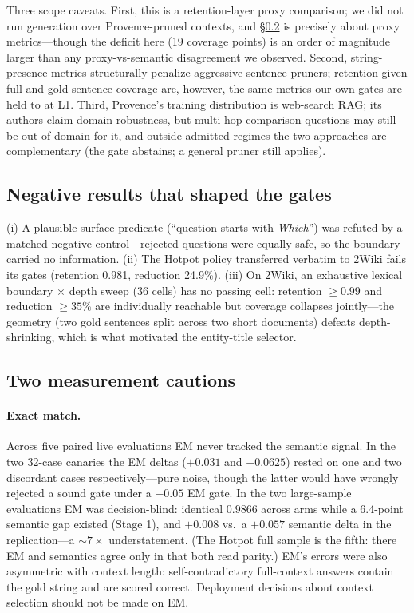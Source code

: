 \documentclass[11pt]{article}
\begin{document}
Three scope caveats. First, this is a retention-layer proxy comparison; we
did not run generation over Provence-pruned contexts, and
\S\ref{sec:cautions} is precisely about proxy metrics---though the deficit
here (19 coverage points) is an order of magnitude larger than any
proxy-vs-semantic disagreement we observed. Second, string-presence
metrics structurally penalize aggressive sentence pruners; retention given
full and gold-sentence coverage are, however, the same metrics our own
gates are held to at L1. Third, Provence's training distribution is
web-search RAG; its authors claim domain robustness, but multi-hop
comparison questions may still be out-of-domain for it, and outside
admitted regimes the two approaches are complementary (the gate abstains;
a general pruner still applies).

\subsection{Negative results that shaped the gates}
\label{sec:negatives}

(i) A plausible surface predicate (``question starts with \emph{Which}'')
was refuted by a matched negative control---rejected questions were
equally safe, so the boundary carried no information. (ii) The Hotpot
policy transferred verbatim to 2Wiki fails its gates (retention 0.981,
reduction 24.9\%). (iii) On 2Wiki, an exhaustive lexical boundary $\times$
depth sweep (36 cells) has no passing cell: retention $\ge 0.99$ and
reduction $\ge 35\%$ are individually reachable but coverage collapses
jointly---the geometry (two gold sentences split across two short
documents) defeats depth-shrinking, which is what motivated the
entity-title selector.

\subsection{Two measurement cautions}
\label{sec:cautions}

\paragraph{Exact match.} Across five paired live evaluations EM never
tracked the semantic signal. In the two 32-case canaries the EM deltas
($+0.031$ and $-0.0625$) rested on one and two discordant cases
respectively---pure noise, though the latter would have wrongly
rejected a sound gate under a $-0.05$ EM gate. In the two large-sample
evaluations EM was decision-blind: identical $0.9866$ across arms while a
6.4-point semantic gap existed (Stage 1), and $+0.008$ vs.\ a $+0.057$
semantic delta in the replication---a ${\sim}7\times$ understatement.
(The Hotpot full sample is the fifth: there EM and semantics agree only in
that both read parity.) EM's errors were also
asymmetric with context length: self-contradictory full-context answers
contain the gold string and are scored correct. Deployment decisions about
context selection should not be made on EM.
\end{document}
